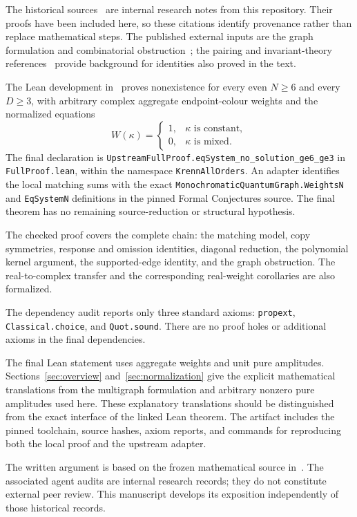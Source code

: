 \documentclass[11pt]{article}
\theoremstyle{definition}
\theoremstyle{plain}
\numberwithin{equation}{section}
\begin{document}
The historical sources~\cite{factors,mixed,pure,omission,diagonal,endpoint}
are internal research notes from this repository. Their proofs have been
included here, so these citations identify provenance rather than replace
mathematical steps. The published external inputs are the graph formulation
and combinatorial obstruction~\cite{kgs,cgi}; the pairing and invariant-theory
references~\cite{isserlis,kraft} provide background for identities also proved
in the text.

The Lean development in~\cite{lean} proves nonexistence for every even
\(N\ge6\) and every \(D\ge3\), with arbitrary complex aggregate
endpoint-colour weights and the normalized equations
\[
 W(\kappa)=
 \begin{cases}
  1,&\kappa\text{ is constant},\\
  0,&\kappa\text{ is mixed}.
 \end{cases}
\]
The final declaration is
\texttt{UpstreamFullProof.eqSystem\_no\_solution\_ge6\_ge3}
in \texttt{FullProof.lean}, within the namespace \texttt{KrennAllOrders}.
An adapter identifies the local matching sums with the exact
\texttt{MonochromaticQuantumGraph.WeightsN} and \texttt{EqSystemN}
definitions in the pinned Formal Conjectures source. The final theorem
has no remaining source-reduction or structural hypothesis.

The checked proof covers the complete chain: the matching model, copy
symmetries, response and omission identities, diagonal reduction, the
polynomial kernel argument, the supported-edge identity, and the graph
obstruction. The real-to-complex transfer and the corresponding real-weight
corollaries are also formalized.

The dependency audit reports only three standard axioms:
\texttt{propext}, \texttt{Classical.choice}, and \texttt{Quot.sound}.
There are no proof holes or additional axioms in the final dependencies.

The final Lean statement uses aggregate weights and unit pure amplitudes.
Sections~\ref{sec:overview} and~\ref{sec:normalization} give the explicit
mathematical translations from the multigraph formulation and arbitrary
nonzero pure amplitudes used here. These explanatory translations should
be distinguished from the exact interface of the linked Lean theorem.
The artifact includes the pinned toolchain, source hashes, axiom reports,
and commands for reproducing both the local proof and the upstream adapter.

The written argument is based on the frozen mathematical source
in~\cite{review}. The associated agent audits are internal research records;
they do not constitute external peer review. This manuscript develops its
exposition independently of those historical records.
\end{document}
